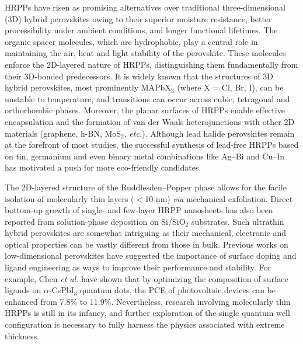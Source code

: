 \documentclass[aps,prl,preprint,11pt,superscriptaddress,bibnotes,amsmath,amssymb,amsfonts,showkeys]{revtex4-2}
\begin{document}
HRPPs have risen as promising alternatives over traditional three-dimensional (3D) hybrid perovskites owing to their superior moisture resistance, better processibility under ambient conditions, and longer functional lifetimes.\cite{TNhrpp16,CShrpp15,SHhrpp14,QYqwell16,SHstab19} The organic spacer molecules, which are hydrophobic, play a central role in maintaining the air, heat and light stability of the perovskite.\cite{SHstab19} These molecules enforce the 2D-layered nature of HRPPs, distinguishing them fundamentally from their 3D-bonded predecessors. It is widely known that the structures of 3D hybrid perovskites, most prominently MAPbX$_3$ (where X = Cl, Br, I), can be unstable to temperature, and transitions can occur across cubic, tetragonal and orthorhombic phases.\cite{OM3dphase90,PW3dphase87} Moreover, the planar surfaces of HRPPs enable effective encapsulation and the formation of van der Waals heterojunctions with other 2D materials (graphene, h-BN, MoS$_2$, \textit{etc.}).\cite{FWplanar19,LAplanar18,SGplanar18} Although lead halide perovskites remain at the forefront of most studies, the successful synthesis of lead-free HRPPs based on tin,\cite{FWplanar19,CSpbfree17} germanium \cite{CWpbfree17} and even binary metal combinations \cite{MMpbfree20} like Ag--Bi and Cu--In has motivated a push for more eco-friendly candidates.

The 2D-layered structure of the Ruddlesden--Popper phase allows for the facile isolation of molecularly thin layers ($<$10 nm) \textit{via} mechanical exfoliation.\cite{GWexf16,YCexf15,NEexf14} Direct bottom-up growth of single- and few-layer HRPP nanosheets has also been reported from solution-phase deposition on Si/SiO$_2$ substrates.\cite{GSsolv19,DWsolv15} Such ultrathin hybrid perovskites are somewhat intriguing as their mechanical, electronic and optical properties can be vastly different from those in bulk.\cite{LAplanar18,DWsolv15,TSultra2d18,QZultra2d18} Previous works on low-dimensional perovskites have suggested the importance of surface doping \cite{OZlowdp18} and ligand engineering \cite{CZlowdp19} as ways to improve their performance and stability. For example, Chen \textit{et al.} have shown that by optimizing the composition of surface ligands on $\alpha$-CsPbI$_3$ quantum dots, the PCE of photovoltaic devices can be enhanced from 7.8\% to 11.9\%.\cite{CZlowdp19} Nevertheless, research involving molecularly thin HRPPs is still in its infancy, and further exploration of the single quantum well configuration is necessary to fully harness the physics associated with extreme thickness.
\end{document}
